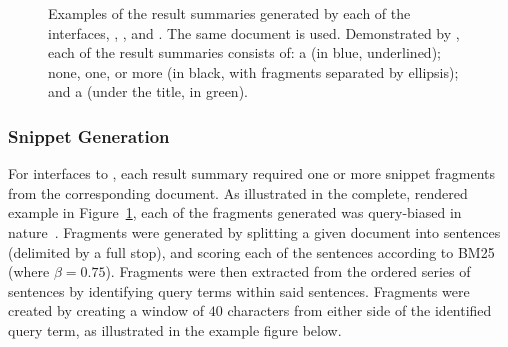 \begin{figure}[t!]
    \centering
    \caption[Examples of result summaries across experimental interfaces]{Examples of the result summaries generated by each of the interfaces, , ,  and . The same document is used. Demonstrated by \searchlogo, each of the result summaries consists of: a  (in blue, underlined); none, one, or more  (in black, with fragments separated by ellipsis); and a  (under the title, in green).}
    \label{fig:interface_snippets}
\end{figure}

\subsubsection{Snippet Generation}\label{sec:snippets:method:snippets}
For interfaces  to , each result summary required one or more snippet fragments from the corresponding document. As illustrated in the complete, rendered example in Figure~\ref{fig:interface_snippets}, each of the fragments generated was query-biased in nature~\citep{tombros1998query_biased}. Fragments were generated by splitting a given document into sentences (delimited by a full stop), and scoring each of the sentences according to BM25 (where $\beta=0.75$). Fragments were then extracted from the ordered series of sentences by identifying query terms within said sentences. Fragments were created by creating a window of $40$ characters from either side of the identified query term, as illustrated in the example figure below.

\begin{figure}[h]
    \centering
    \vspace{4mm}
    \label{fig:fragment_example}
    \vspace{-5mm}
\end{figure}


